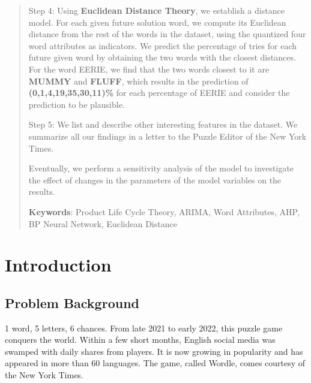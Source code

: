 \documentclass[12pt]{article}  %
\begin{document}
\begin{abstract}
	Step 4: Using \textbf{Euclidean Distance Theory}, we establish a distance model. For each given future solution word, we compute its Euclidean distance from the rest of the words in the dataset, using the quantized four word attributes as indicators. We predict the percentage of tries for each future given word by obtaining the two words with the closest distances. For the word EERIE, we find that the two words closest to it are \textbf{MUMMY} and \textbf{FLUFF}, which results in the prediction of \textbf{(0,1,4,19,35,30,11)\%} for each percentage of EERIE and consider the prediction to be plausible.
	
	Step 5: We list and describe other interesting features in the dataset. We summarize all our findings in a letter to the Puzzle Editor of the New York Times.
	
	Eventually, we perform a sensitivity analysis of the model to investigate the effect of changes in the parameters of the model variables on the results.

    \vspace{5pt}  %
    \textbf{Keywords}: Product Life Cycle Theory, ARIMA, Word Attributes, AHP, BP Neural Network, Euclidean Distance

\end{abstract}

\maketitle  %

\tableofcontents  %


\section{Introduction}

\subsection{Problem Background}
1 word, 5 letters, 6 chances. From late 2021 to early 2022, this puzzle game conquers the world. Within a few short months, English social media was swamped with daily shares from players. It is now growing in popularity and has appeared in more than 60 languages. The game, called Wordle, comes courtesy of the New York Times.
\end{document}
